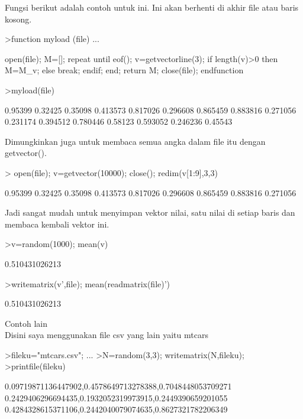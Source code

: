 \documentclass{article}
\begin{document}
\begin{eulernotebook}
\begin{eulercomment}
\begin{eulercomment}
\begin{eulercomment}
Fungsi berikut adalah contoh untuk ini. Ini akan berhenti di akhir
file atau baris kosong.
\end{eulercomment}
\begin{eulerprompt}
>function myload (file) ...
\end{eulerprompt}
\begin{eulerudf}
  open(file);
  M=[];
  repeat
     until eof();
     v=getvectorline(3);
     if length(v)>0 then M=M_v; else break; endif;
  end;
  return M;
  close(file);
  endfunction
\end{eulerudf}
\begin{eulerprompt}
>myload(file)
\end{eulerprompt}
\begin{euleroutput}
        0.95399       0.32425       0.35098      0.413573 
       0.817026      0.296608      0.865459      0.883816 
       0.271056      0.231174      0.394512      0.780446 
        0.58123      0.593052      0.246236       0.45543 
\end{euleroutput}
\begin{eulercomment}
Dimungkinkan juga untuk membaca semua angka dalam file itu dengan
getvector().
\end{eulercomment}
\begin{eulerprompt}
> open(file); v=getvector(10000); close(); redim(v[1:9],3,3)
\end{eulerprompt}
\begin{euleroutput}
        0.95399       0.32425       0.35098 
       0.413573      0.817026      0.296608 
       0.865459      0.883816      0.271056 
\end{euleroutput}
\begin{eulercomment}
Jadi sangat mudah untuk menyimpan vektor nilai, satu nilai di setiap
baris dan membaca kembali vektor ini.
\end{eulercomment}
\begin{eulerprompt}
>v=random(1000); mean(v)
\end{eulerprompt}
\begin{euleroutput}
  0.510431026213
\end{euleroutput}
\begin{eulerprompt}
>writematrix(v',file); mean(readmatrix(file)')
\end{eulerprompt}
\begin{euleroutput}
  0.510431026213
\end{euleroutput}
\begin{eulercomment}
Contoh lain\\
Disini saya menggunakan file csv yang lain yaitu mtcars
\end{eulercomment}
\begin{eulerprompt}
>fileku="mtcars.csv"; ...
>N=random(3,3); writematrix(N,fileku);
>printfile(fileku)
\end{eulerprompt}
\begin{euleroutput}
  0.09719871136447902,0.4578649713278388,0.7048448053709271
  0.2429406296694435,0.1932052319973915,0.2449390659201055
  0.4284328615371106,0.2442040079074635,0.8627321782206349
  

\end{euleroutput}
\end{eulercomment}
\end{eulercomment}
\end{eulernotebook}
\end{document}
